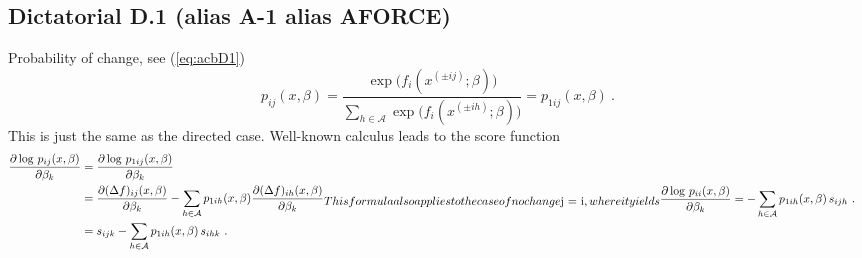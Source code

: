 \documentclass[a4paper,12pt,fleqn]{article}
\begin{document}
\subsection{Dictatorial D.1 (alias A-1 alias AFORCE)}
Probability of change, see (\ref{eq:acbD1})
      \begin{equation}
        p_{ij}(x, \beta) = \frac{\exp\big(f_i(x^{(\pm ij)}; \beta)\big)}
         {\sum_{h \in \mathcal A} \exp\big(f_i(x^{(\pm ih)}; \beta)\big)}  =
        p_{1ij}(x, \beta)
          \ .
      \end{equation}
This is just the same as the directed case.
Well-known calculus leads to the score function
\begin{subequations}
      \begin{align}
      \frac{\partial \log\, p_{ij}(x, \beta)}{\partial \beta_k}
      &=      \frac{\partial \log\, p_{1ij}(x, \beta)}{\partial \beta_k} \nonumber \\
      &=  \frac{\partial  (\Delta f)_{ij}(x, \beta)}{\partial \beta_k} -  \nonumber
           \sum_{h  \in \mathcal A}  p_{1ih}(x, \beta) \frac{\partial  (\Delta f)_{ih}(x, \beta)}{\partial \beta_k} \\
      &=  s_{ijk} -
           \sum_{h  \in \mathcal A}  p_{1ih}(x, \beta)\,s_{ihk} \ .
             \label{eq:cD1}
      \end{align}
This formula also applies to the case of no change $j = i$, where it yields
      \begin{align}
      \frac{\partial \log\, p_{ii}(x, \beta)}{\partial \beta_k}
      &=   -  \sum_{h \in \mathcal A}  p_{1ih}(x, \beta) \, s_{ijh} \ .
             \label{eq:cD2}
      \end{align}
\end{subequations}
\end{document}
